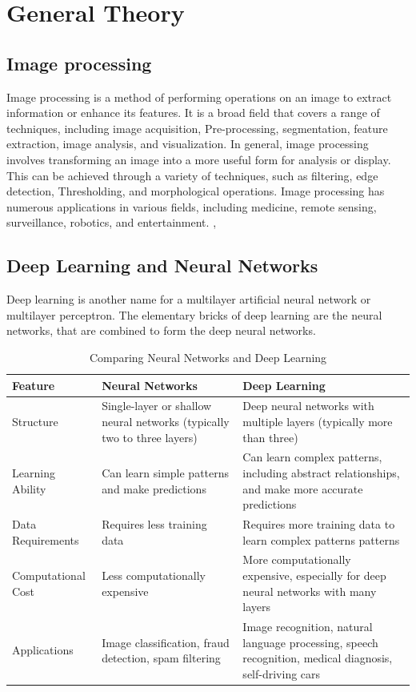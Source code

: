 \section{General Theory}
\subsection{Image processing}
Image processing is a method of performing operations on an image to extract information or enhance its features. It is a broad field that covers a range of techniques, including image acquisition, Pre-processing, segmentation, feature extraction, image analysis, and visualization. In general, image processing involves transforming an image into a more useful form for analysis or display. This can be achieved through a variety of techniques, such as filtering, edge detection, Thresholding, and morphological operations. Image processing has numerous applications in various fields, including medicine, remote sensing, surveillance, robotics, and entertainment. \cite{wilhelm2016digital}, \cite{tyagi2018understanding} 

\subsection{Deep Learning and Neural Networks}
Deep learning is another name for a multilayer artificial neural network or multilayer perceptron. The elementary
bricks of deep learning are the neural networks, that are combined to form the deep neural networks.

\begin{table}[htbp]
\centering
\caption{Comparing Neural Networks and Deep Learning}
\begin{tabular}{ |p{3cm}|p{5cm}|p{5cm}| }%
\hline
Feature & Neural Networks & Deep Learning \\
\hline
Structure & Single-layer or shallow neural networks (typically two to three layers) & Deep neural networks with multiple layers (typically more than three) \\
\hline
Learning Ability & Can learn simple patterns and make predictions & Can learn complex patterns, including abstract relationships, and make more accurate predictions \\
\hline
Data Requirements & Requires less training data & Requires more training data to learn complex patterns patterns \\
\hline
Computational Cost & Less computationally expensive & More computationally expensive, especially for deep neural networks with many layers \\
\hline
Applications & Image classification, fraud detection, spam filtering & Image recognition, natural language processing, speech recognition, medical diagnosis, self-driving cars \\
\hline
\end{tabular}
\end{table}

